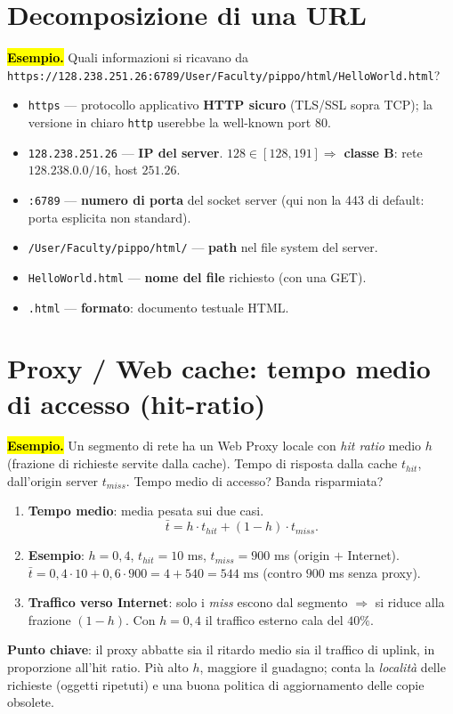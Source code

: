 \documentclass[11pt,a4paper]{report}
\begin{document}
\section{Decomposizione di una URL}
\label{teoria:url}
\hl{\textbf{Esempio.}} Quali informazioni si ricavano da
\texttt{https://128.238.251.26:6789/User/Faculty/pippo/html/HelloWorld.html}?
\begin{itemize}[noitemsep]
\item \texttt{https} --- protocollo applicativo \textbf{HTTP sicuro} (TLS/SSL sopra
TCP); la versione in chiaro \texttt{http} userebbe la well-known port 80.
\item \texttt{128.238.251.26} --- \textbf{IP del server}. $128\in[128,191]
\Rightarrow$ \textbf{classe B}: rete $128.238.0.0/16$, host $251.26$.
\item \texttt{:6789} --- \textbf{numero di porta} del socket server (qui non la 443
di default: porta esplicita non standard).
\item \texttt{/User/Faculty/pippo/html/} --- \textbf{path} nel file system del server.
\item \texttt{HelloWorld.html} --- \textbf{nome del file} richiesto (con una GET).
\item \texttt{.html} --- \textbf{formato}: documento testuale HTML.
\end{itemize}

\section{Proxy / Web cache: tempo medio di accesso (hit-ratio)}
\label{teoria:proxy}
\hl{\textbf{Esempio.}} Un segmento di rete ha un Web Proxy locale con
\emph{hit ratio} medio $h$ (frazione di richieste servite dalla cache). Tempo di
risposta dalla cache $t_{hit}$, dall'origin server $t_{miss}$. Tempo medio di
accesso? Banda risparmiata?
\begin{enumerate}[noitemsep]
\item \textbf{Tempo medio}: media pesata sui due casi.
\[ \bar t = h\cdot t_{hit} + (1-h)\cdot t_{miss}. \]
\item \textbf{Esempio}: $h=0{,}4$, $t_{hit}=10$ ms, $t_{miss}=900$ ms (origin
$+$ Internet). $\bar t = 0{,}4\cdot10 + 0{,}6\cdot900 = 4+540 = \boxed{544 \text{ ms}}$
(contro $900$ ms senza proxy).
\item \textbf{Traffico verso Internet}: solo i \emph{miss} escono dal segmento
$\Rightarrow$ si riduce alla frazione $(1-h)$. Con $h=0{,}4$ il traffico esterno
cala del $40\%$.
\end{enumerate}
\textbf{Punto chiave}: il proxy abbatte sia il ritardo medio sia il traffico di
uplink, in proporzione all'hit ratio. Più alto $h$, maggiore il guadagno; conta
la \emph{località} delle richieste (oggetti ripetuti) e una buona politica di
aggiornamento delle copie obsolete.
\end{document}
